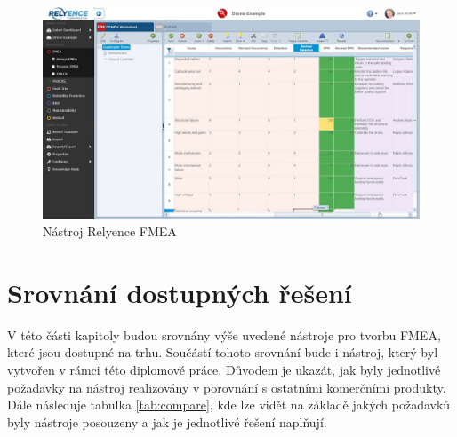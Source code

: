 \begin{figure}[h]
\centering
	\includegraphics[width=1.0\textwidth]{Figures/relyence.jpg}
	\caption{Nástroj Relyence FMEA }
	\label{fig:relyence}
\end{figure}

\section{Srovnání dostupných řešení}
V této části kapitoly budou srovnány výše uvedené nástroje pro tvorbu FMEA, které jsou dostupné na trhu. Součástí tohoto srovnání bude i nástroj, který byl vytvořen v rámci této diplomové práce. Důvodem je ukazát, jak byly jednotlivé požadavky na nástroj realizovány v porovnání s ostatními komerčními produkty. Dále následuje tabulka \ref{tab:compare}, kde lze vidět na základě jakých požadavků byly nástroje posouzeny a jak je jednotlivé řešení naplňují.
\newpage

